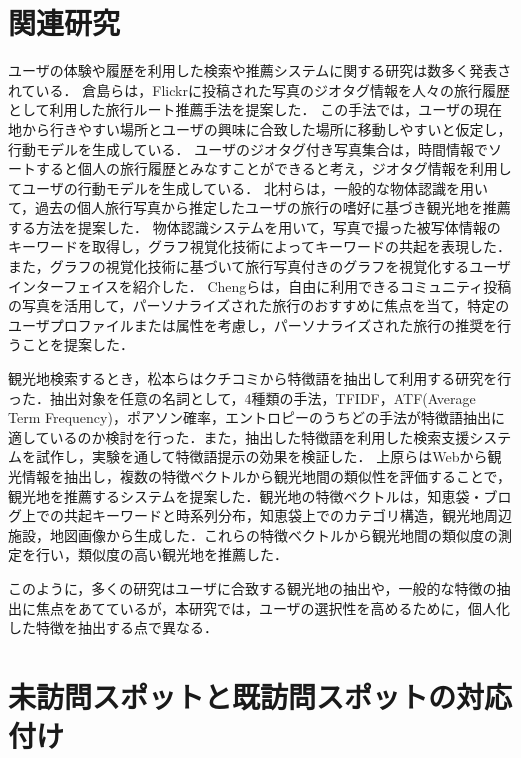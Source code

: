 \documentclass[submit]{ipsj}
\begin{document}
\section{関連研究}
ユーザの体験や履歴を利用した検索や推薦システムに関する研究は数多く発表されている．
倉島ら\cite{Codd03}は，Flickrに投稿された写真のジオタグ情報を人々の旅行履歴として利用した旅行ルート推薦手法を提案した．
この手法では，ユーザの現在地から行きやすい場所とユーザの興味に合致した場所に移動しやすいと仮定し，行動モデルを生成している．
ユーザのジオタグ付き写真集合は，時間情報でソートすると個人の旅行履歴とみなすことができると考え，ジオタグ情報を利用してユーザの行動モデルを生成している．
北村ら\cite{Codd04}は，一般的な物体認識を用いて，過去の個人旅行写真から推定したユーザの旅行の嗜好に基づき観光地を推薦する方法を提案した．
物体認識システムを用いて，写真で撮った被写体情報のキーワードを取得し，グラフ視覚化技術によってキーワードの共起を表現した．
また，グラフの視覚化技術に基づいて旅行写真付きのグラフを視覚化するユーザインターフェイスを紹介した．
Chengら\cite{Codd05}は，自由に利用できるコミュニティ投稿の写真を活用して，パーソナライズされた旅行のおすすめに焦点を当て，特定のユーザプロファイルまたは属性を考慮し，パーソナライズされた旅行の推奨を行うことを提案した．

観光地検索するとき，松本ら\cite{Codd08}はクチコミから特徴語を抽出して利用する研究を行った．抽出対象を任意の名詞として，4種類の手法，TFIDF，ATF(Average Term Frequency)，ポアソン確率，エントロピーのうちどの手法が特徴語抽出に適しているのか検討を行った．また，抽出した特徴語を利用した検索支援システムを試作し，実験を通して特徴語提示の効果を検証した．
上原ら\cite{Codd09}はWebから観光情報を抽出し，複数の特徴ベクトルから観光地間の類似性を評価することで，観光地を推薦するシステムを提案した．観光地の特徴ベクトルは，知恵袋・ブログ上での共起キーワードと時系列分布，知恵袋上でのカテゴリ構造，観光地周辺施設，地図画像から生成した．これらの特徴ベクトルから観光地間の類似度の測定を行い，類似度の高い観光地を推薦した．

このように，多くの研究はユーザに合致する観光地の抽出や，一般的な特徴の抽出に焦点をあてているが，本研究では，ユーザの選択性を高めるために，個人化した特徴を抽出する点で異なる．

\section{未訪問スポットと既訪問スポットの対応付け}
\label{sec:未訪問スポットと既訪問スポットの対応付け}
\end{document}
